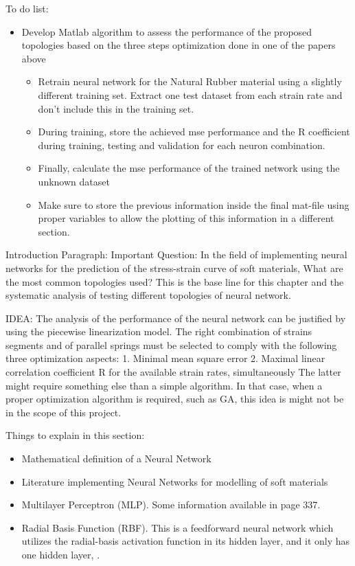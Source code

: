 To do list:
\begin{itemize}
    \item Develop Matlab algorithm to assess the performance of the proposed topologies based on the three steps optimization done in one of the papers above
    \begin{itemize}
        \item Retrain neural network for the Natural Rubber material using a slightly different training set. Extract one test dataset from each strain rate and don't include this in the training set.
    \item During training, store the achieved mse performance and the R coefficient during training, testing and validation for each neuron combination.
    \item Finally, calculate the mse performance of the trained network using the unknown dataset
    \item Make sure to store the previous information inside the final mat-file using proper variables to allow the plotting of this information in a different section.
    \end{itemize}
\end{itemize}

Introduction Paragraph: Important Question: In the field of implementing neural networks for the prediction of the stress-strain curve of soft materials, What are the most common topologies used? This is the base line for this chapter and the systematic analysis of testing different topologies of neural network.

IDEA: The analysis of the performance of the neural network can be justified by using the piecewise linearization model. The right combination of strains segments and of parallel springs must be selected to comply with the following three optimization aspects: 1. Minimal mean square error 
2. Maximal linear correlation coefficient R for the available strain rates, simultaneously
The latter might require something else than a simple algorithm. In that case, when a proper optimization algorithm is required, such as GA, this idea is might not be in the scope of this project.


Things to explain in this section:
\begin{itemize}
    \item Mathematical definition of a Neural Network
    \item Literature implementing Neural Networks for modelling of soft materials
    \item Multilayer Perceptron (MLP). Some information available in \cite{aulova2017determination} page 337.
    \item Radial Basis Function (RBF). This is a feedforward neural network which utilizes the radial-basis activation function in its hidden layer, and it only has one hidden layer, \cite{aulova2017determination}.
\end{itemize}

